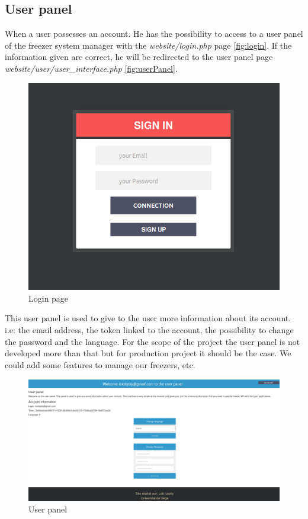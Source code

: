 \subsection{User panel}
When a user possesses an account. He has the possibility to access to a user panel of the freezer system manager with the \textit{website/login.php} page \autoref{fig:login}. If the information given are correct, he will be redirected to the user panel page \textit{website/user/user\_interface.php} \autoref{fig:userPanel}.
\begin{figure}[H]
\centering
\includegraphics[scale=0.4]{./images/login.png}
\caption{Login page}
\label{fig:login}
\end{figure}

This user panel is used to give to the user more information about its account. i.e: the email address, the token linked to the account, the possibility to change the password and the language. For the scope of the project the user panel is not developed more than that but for production project it should be the case. We could add some features to manage our freezers, etc.

\begin{figure}[H]
\centering
\includegraphics[scale=0.25]{./images/userPanel.png}
\caption{User panel}
\label{fig:userPanel}
\end{figure}
